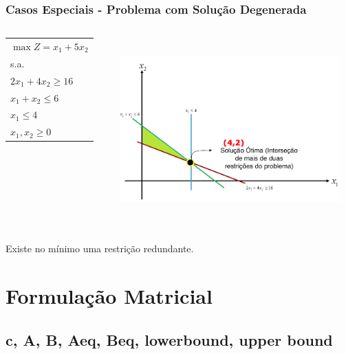 \documentclass{beamer}
\begin{document}
\begin{frame}
	\frametitle{Casos Especiais - Problema com Solução Degenerada}
	\centering
	\begin{columns}
		\begin{column}{0.3\textwidth}
			\begin{mdframed}[backgroundcolor=blue!20] 
				\scriptsize
				\begin{tabular}{l}
				$\max Z = x_1 + 5x_2$ \\
				s.a. \\
				$2x_1+4x_2 \ge 16$ \\
				$x_1+x_2 \le 6$ \\
				$x_1 \le 4$ \\
				$x_1, x_2 \ge 0 $ \\ 
				\end{tabular}
			\end{mdframed}
		\end{column}
		\begin{column}{0.7\textwidth}
			\includegraphics[width=8.5cm,height=7cm]{CasosEspeciais-Degenerada.png}
		\end{column}
	\end{columns}
	{\color{red}Existe no mínimo uma restrição redundante.}
\end{frame}


\section{Formulação Matricial}
\subsection{c, A, B, Aeq, Beq, lowerbound, upper bound}
\end{document}
